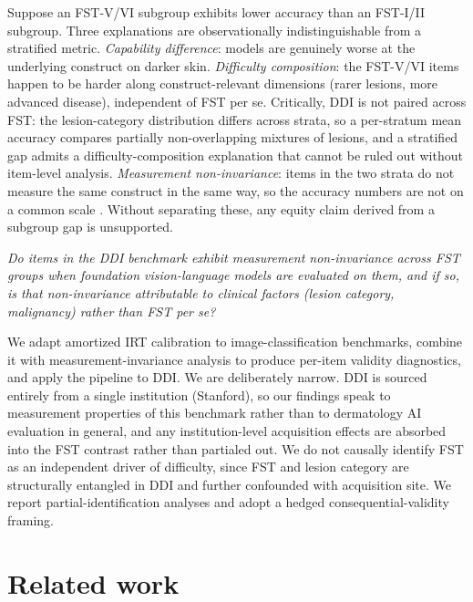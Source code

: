 \documentclass{article}
\begin{document}
Suppose an FST-V/VI subgroup exhibits lower accuracy than an FST-I/II subgroup. Three explanations are observationally indistinguishable from a stratified metric. \emph{Capability difference}: models are genuinely worse at the underlying construct on darker skin. \emph{Difficulty composition}: the FST-V/VI items happen to be harder along construct-relevant dimensions (rarer lesions, more advanced disease), independent of FST per se. Critically, DDI is not paired across FST: the lesion-category distribution differs across strata, so a per-stratum mean accuracy compares partially non-overlapping mixtures of lesions, and a stratified gap admits a difficulty-composition explanation that cannot be ruled out without item-level analysis. \emph{Measurement non-invariance}: items in the two strata do not measure the same construct in the same way, so the accuracy numbers are not on a common scale \citep{borsboom2004concept}. Without separating these, any equity claim derived from a subgroup gap is unsupported.

\textit{Do items in the DDI benchmark \citep{daneshjou2022disparities} exhibit measurement non-invariance across FST groups when foundation vision-language models are evaluated on them, and if so, is that non-invariance attributable to clinical factors (lesion category, malignancy) rather than FST per se?}

We adapt amortized IRT calibration \citep{truong2025reliableefficientamortizedmodelbased} to image-classification benchmarks, combine it with measurement-invariance analysis to produce per-item validity diagnostics, and apply the pipeline to DDI. We are deliberately narrow. DDI is sourced entirely from a single institution (Stanford), so our findings speak to measurement properties of this benchmark rather than to dermatology AI evaluation in general, and any institution-level acquisition effects are absorbed into the FST contrast rather than partialed out. We do not causally identify FST as an independent driver of difficulty, since FST and lesion category are structurally entangled in DDI and further confounded with acquisition site. We report partial-identification analyses and adopt a hedged consequential-validity framing.

\section{Related work}
\label{sec:related}
\end{document}
